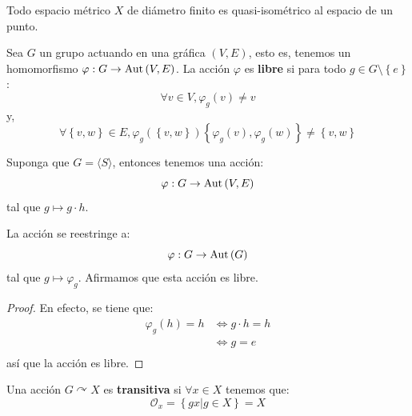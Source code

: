 \documentclass[12pt]{report}
\newcounter{it}
\theoremstyle{largebreak}
\newcommand\cf[3]{\ensuremath{#1:#2\rightarrow#3}}
\newcommand\Aut[1]{\ensuremath{\textup{Aut}\left(#1\right)}}
\newcommand{\gen}[1]{\ensuremath{\langle#1\rangle}}
\begin{document}
    \begin{exa}
        Todo espacio métrico $X$ de diámetro finito es quasi-isométrico al espacio de un punto.
    \end{exa}

    \begin{mydef}
        Sea $G$ un grupo actuando en una gráfica $(V,E)$, esto es, tenemos un homomorfismo $\cf{\varphi}{G}{\Aut{V,E}}$. La acción $\varphi$ es \textbf{libre} si para todo $g\in G\setminus\left\{e\right\}$:
        \begin{equation*}
            \forall v\in V, \varphi_g(v)\neq v
        \end{equation*}
        y,
        \begin{equation*}
            \forall\left\{v,w \right\}\in E,\varphi_g\left(\left\{v,w \right\}\right) \left\{\varphi_g(v),\varphi_g(w) \right\}\neq \left\{v,w \right\}
        \end{equation*}
    \end{mydef}

    \begin{exa}
        Suponga que $G=\gen{S}$, entonces tenemos una acción:
        \begin{equation*}
            \cf{\varphi}{G}{\Aut{V,E}}
        \end{equation*}
        tal que $g\mapsto g\cdot h$.
    \end{exa}

    \begin{obs}
        La acción se reestringe a:
        \begin{equation*}
            \cf{\varphi}{G}{\Aut{G}}
        \end{equation*}
        tal que $g\mapsto\varphi_g$. Afirmamos que esta acción es libre.
    \end{obs}

    \begin{proof}
        En efecto, se tiene que:
        \begin{equation*}
            \begin{split}
                \varphi_g(h)=h&\iff g\cdot h=h\\
                &\iff g=e\\
            \end{split}
        \end{equation*}
        así que la acción es libre.
    \end{proof}

    \begin{mydef}
        Una acción $G\curvearrowright X$ es \textbf{transitiva} si $\forall x\in X$ tenemos que:
        \begin{equation*}
            \mathcal{O}_x=\left\{gx\Big|g\in X \right\}=X
        \end{equation*}
    \end{mydef}
\end{document}
